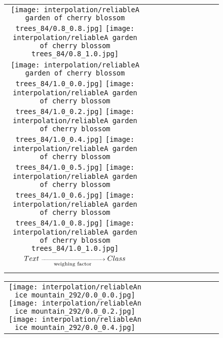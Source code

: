 \documentclass[10pt,twocolumn,letterpaper]{article}
\begin{document}
\begin{figure*}[tb!]
{\begin{tabular}{c c c c c c c c c c}
  \texttt{[image: interpolation/reliableA garden of cherry blossom trees\_84/0.8\_0.8.jpg]}
  \texttt{[image: interpolation/reliableA garden of cherry blossom trees\_84/0.8\_1.0.jpg]}
\tabularnewline
    \raisebox{0.1in}{\rotatebox{90}{\small \emph{$1.0$}
 }}
  \texttt{[image: interpolation/reliableA garden of cherry blossom trees\_84/1.0\_0.0.jpg]}
  \texttt{[image: interpolation/reliableA garden of cherry blossom trees\_84/1.0\_0.2.jpg]}
   \texttt{[image: interpolation/reliableA garden of cherry blossom trees\_84/1.0\_0.4.jpg]}
  \texttt{[image: interpolation/reliableA garden of cherry blossom trees\_84/1.0\_0.5.jpg]}
  \texttt{[image: interpolation/reliableA garden of cherry blossom trees\_84/1.0\_0.6.jpg]}
  \texttt{[image: interpolation/reliableA garden of cherry blossom trees\_84/1.0\_0.8.jpg]}
  \texttt{[image: interpolation/reliableA garden of cherry blossom trees\_84/1.0\_1.0.jpg]}
    \tabularnewline
        \raisebox{0.1in}{\rotatebox{90}{
 }}
 \hspace{0.5mm}
$\scriptsize{Text}\xrightarrow[\text{weighing factor}]{\hspace*{3cm}}\scriptsize{Class}$
  \tabularnewline
\vspace{2mm}
\vspace{-2\baselineskip}
\end{tabular}}
\vspace{-0.8cm}
\hspace{20pt}
\label{fig:glideablation12}
\vspace{-2mm}
\end{figure*} \begin{figure*}[tb!]
    \centering
    \setlength{\tabcolsep}{0.5pt}
    {\small
    \renewcommand{\arraystretch}{0.5} 
    \begin{tabular}{c c c c c c c c c c}
    \captionsetup{type=figure, font=scriptsize}
    \raisebox{0.1in}{\rotatebox{90}{\small \emph{$0.0$}
 }}
  \texttt{[image: interpolation/reliableAn ice mountain\_292/0.0\_0.0.jpg]}
  \texttt{[image: interpolation/reliableAn ice mountain\_292/0.0\_0.2.jpg]}
  \texttt{[image: interpolation/reliableAn ice mountain\_292/0.0\_0.4.jpg]}

\end{tabular}}
\end{figure*}
\end{document}
